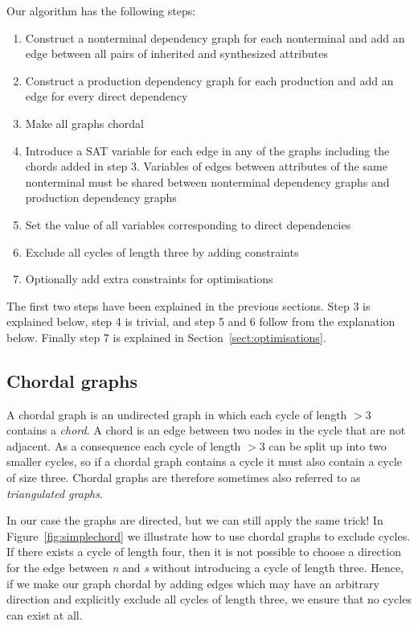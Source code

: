 \documentclass{llncs}
\newcommand{\figref}[1]{Figure~\ref{#1}}
\newcommand{\sectref}[1]{Section~\ref{#1}}
\begin{document}
Our algorithm has the following steps:
\begin{enumerate}
\item Construct a nonterminal dependency graph for each nonterminal and add an edge between all pairs of inherited and synthesized attributes
\item Construct a production dependency graph for each production and add an edge for every direct dependency
\item Make all graphs chordal
\item Introduce a SAT variable for each edge in any of the graphs including the chords added in step 3. Variables of edges between attributes of the same nonterminal must be shared between nonterminal dependency graphs and production dependency graphs
\item Set the value of all variables corresponding to direct dependencies
\item Exclude all cycles of length three by adding constraints
\item Optionally add extra constraints for optimisations
\end{enumerate}
The first two steps have been explained in the previous sections. Step 3 is explained below, step 4 is trivial, and step 5 and 6 follow from the explanation below. Finally step 7 is explained in \sectref{sect:optimisations}.

\subsection{Chordal graphs}
A chordal graph is an undirected graph in which each cycle of length $> 3$ contains a \emph{chord}. A chord is an edge between two nodes in the cycle that are not adjacent. As a consequence each cycle of length $> 3$ can be split up into two smaller cycles, so if a chordal graph contains a cycle it must also contain a cycle of size three. Chordal graphs are therefore sometimes also referred to as \emph{triangulated graphs}.


In our case the graphs are directed, but we can still apply the same trick! In \figref{fig:simplechord} we illustrate how to use chordal graphs to exclude cycles. If there exists a cycle of length four, then it is not possible to choose a direction for the edge between \emph{n} and \emph{s} without introducing a cycle of length three. Hence, if we make our graph chordal by adding edges which may have an arbitrary direction and explicitly exclude all cycles of length three, we ensure that no cycles can exist at all.
\end{document}
